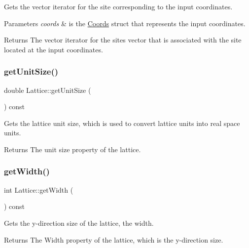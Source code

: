 Gets the vector iterator for the site corresponding to the input coordinates. 


\begin{DoxyParams}{Parameters}
{\em coords} & is the \hyperlink{struct_coords}{Coords} struct that represents the input coordinates. \\
\hline
\end{DoxyParams}
\begin{DoxyReturn}{Returns}
The vector iterator for the sites vector that is associated with the site located at the input coordinates. 
\end{DoxyReturn}
\mbox{\label{class_lattice_ac6963a6b2b4b8d96d3417f6e9c2a509d}} 
\subsubsection{\texorpdfstring{get\+Unit\+Size()}{getUnitSize()}}
{\footnotesize\ttfamily double Lattice\+::get\+Unit\+Size (\begin{DoxyParamCaption}{ }\end{DoxyParamCaption}) const}



Gets the lattice unit size, which is used to convert lattice units into real space units. 

\begin{DoxyReturn}{Returns}
The unit size property of the lattice. 
\end{DoxyReturn}
\mbox{\label{class_lattice_aeb60d2b8bfb02d9da8bef463f0d41428}} 
\subsubsection{\texorpdfstring{get\+Width()}{getWidth()}}
{\footnotesize\ttfamily int Lattice\+::get\+Width (\begin{DoxyParamCaption}{ }\end{DoxyParamCaption}) const}



Gets the y-\/direction size of the lattice, the width. 

\begin{DoxyReturn}{Returns}
The Width property of the lattice, which is the y-\/direction size. 
\end{DoxyReturn}
\mbox{\label{class_lattice_a2b0a88048fae662aa71386a3a123a260}} 
